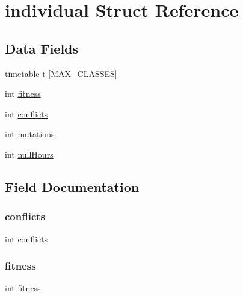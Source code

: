 \hypertarget{structindividual}{}\section{individual Struct Reference}
\label{structindividual}
\subsection*{Data Fields}
\begin{DoxyCompactItemize}
\item 
\hyperlink{structtimetable}{timetable} \hyperlink{structindividual_a80bde47459d4d03a7f1ed0c6fb5e2ffb}{t} \mbox{[}\hyperlink{main_8c_aa322a61b17e1d56852d53d5ef6a728c6}{M\+A\+X\+\_\+\+C\+L\+A\+S\+S\+ES}\mbox{]}
\item 
int \hyperlink{structindividual_ab2cb5ef123761236be21ad8440cb6e6b}{fitness}
\item 
int \hyperlink{structindividual_a1f1395e2be404ae075418f003d89342c}{conflicts}
\item 
int \hyperlink{structindividual_a935150bbe2179cbd3ea7428dd8d459c1}{mutations}
\item 
int \hyperlink{structindividual_ac45c43cafaa02d7cab79893188a9164d}{null\+Hours}
\end{DoxyCompactItemize}


\subsection{Field Documentation}
\hypertarget{structindividual_a1f1395e2be404ae075418f003d89342c}{}\label{structindividual_a1f1395e2be404ae075418f003d89342c} 
\subsubsection{\texorpdfstring{conflicts}{conflicts}}
{\footnotesize\ttfamily int conflicts}

\hypertarget{structindividual_ab2cb5ef123761236be21ad8440cb6e6b}{}\label{structindividual_ab2cb5ef123761236be21ad8440cb6e6b} 
\subsubsection{\texorpdfstring{fitness}{fitness}}
{\footnotesize\ttfamily int fitness}

